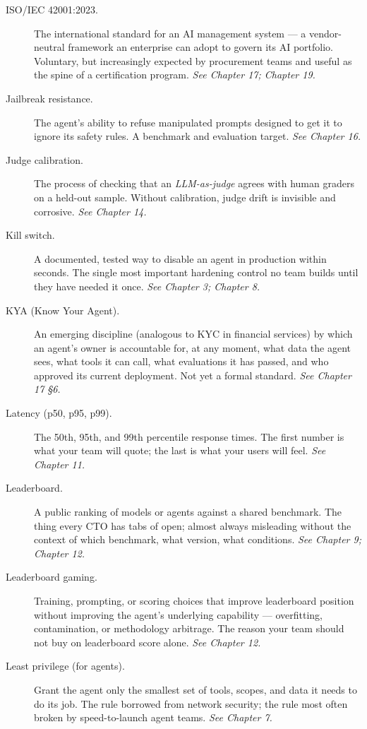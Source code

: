 \begin{description}
  \item[ISO/IEC 42001:2023.] The international standard for an AI management system — a vendor-neutral framework an enterprise can adopt to govern its AI portfolio. Voluntary, but increasingly expected by procurement teams and useful as the spine of a certification program. \textit{See Chapter 17; Chapter 19.}
  \item[Jailbreak resistance.] The agent's ability to refuse manipulated prompts designed to get it to ignore its safety rules. A benchmark and evaluation target. \textit{See Chapter 16.}
  \item[Judge calibration.] The process of checking that an \textit{LLM-as-judge} agrees with human graders on a held-out sample. Without calibration, judge drift is invisible and corrosive. \textit{See Chapter 14.}
  \item[Kill switch.] A documented, tested way to disable an agent in production within seconds. The single most important hardening control no team builds until they have needed it once. \textit{See Chapter 3; Chapter 8.}
  \item[KYA (Know Your Agent).] An emerging discipline (analogous to KYC in financial services) by which an agent's owner is accountable for, at any moment, what data the agent sees, what tools it can call, what evaluations it has passed, and who approved its current deployment. Not yet a formal standard. \textit{See Chapter 17 §6.}
  \item[Latency (p50, p95, p99).] The 50th, 95th, and 99th percentile response times. The first number is what your team will quote; the last is what your users will feel. \textit{See Chapter 11.}
  \item[Leaderboard.] A public ranking of models or agents against a shared benchmark. The thing every CTO has tabs of open; almost always misleading without the context of which benchmark, what version, what conditions. \textit{See Chapter 9; Chapter 12.}
  \item[Leaderboard gaming.] Training, prompting, or scoring choices that improve leaderboard position without improving the agent's underlying capability — overfitting, contamination, or methodology arbitrage. The reason your team should not buy on leaderboard score alone. \textit{See Chapter 12.}
  \item[Least privilege (for agents).] Grant the agent only the smallest set of tools, scopes, and data it needs to do its job. The rule borrowed from network security; the rule most often broken by speed-to-launch agent teams. \textit{See Chapter 7.}

\end{description}
